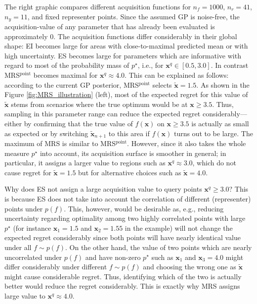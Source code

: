 \documentclass[10pt,letterpaper]{article} %
\begin{document}
The right graphic compares different acquisition functions for $n_f = 1000$,
$n_r=41$, $n_y = 11$, and fixed representer points.  Since the assumed GP is noise-free, the
acquisition-value of any parameter that has already been evaluated is approximately $0$.  The acquisition functions differ considerably in
their global shape: EI becomes large for areas with close-to-maximal predicted mean or with high uncertainty.
 ES becomes large for parameters which are informative with regard to most of the
probability mass of $p^\star$, i.e., for $\mathbf{x}^q \in [0.5, 3.0]$.  In contrast
MRS$^\text{point}$ becomes maximal for $\mathbf{x}^q \approx 4.0$. This can be
explained as follows: according to the current GP posterior, MRS$^\text{point}$ selects $\mathbf{\tilde x} = 1.5$. As shown in the Figure \ref{fig:MRS_illustration} (left),
most of the expected regret for this value of $\mathbf{\tilde x}$ stems from scenarios
where the true optimum would be at $\mathbf{x} \geq 3.5$. Thus, sampling in this
parameter range can reduce the expected regret considerably---either by confirming that the true value of $f(\mathbf{x})$ on $\mathbf{x} \geq 3.5$ is actually as small as expected or by switching $\mathbf{\tilde x}_{n+1}$ to this area if $f(\mathbf{x})$ turns out to be large. The maximum of MRS
is similar to MRS$^\text{point}$. However, since it also takes the whole measure
$p^\star$ into account, its acquisition surface is smoother in general; in particular, it assigns a larger value to regions such as $\mathbf{x}^q
\approx 3.0$, which do not cause regret for $\mathbf{\tilde x} = 1.5$ but for
alternative choices such as $\mathbf{\tilde x} = 4.0$.

Why does ES not assign a large acquisition value to query points $\mathbf{x}^q \geq 3.0$?
This is because ES does not take into account the correlation of different
(representer) points under $p(f)$. This, however, would be desirable as, e.g.,
reducing uncertainty regarding optimality among two highly correlated points
with large $p^\star$ (for instance $\mathbf{x}_1 = 1.5$ and $\mathbf{x}_2 =
1.55$ in the example) will not change the expected regret considerably since
both points will have nearly identical value under all $f \sim p(f)$. On the
other hand, the value of two points which are nearly uncorrelated under $p(f)$ and have non-zero $p^\star$ such as
$\mathbf{x}_1$ and $\mathbf{x}_3 = 4.0$ might differ considerably under
different $f \sim p(f)$ and choosing the wrong one as $\mathbf{\tilde x}$ might
cause considerable regret. Thus, identifying which of the two is actually
better would reduce the regret considerably. This is exactly why MRS assigns large value to $\mathbf{x}^q \approx 4.0$.
\end{document}
